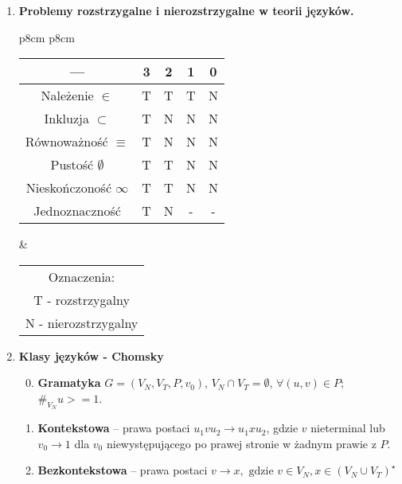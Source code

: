 \documentclass[12pt]{article}
\begin{document}
\begin{enumerate}
        \item \textbf{Problemy rozstrzygalne i nierozstrzygalne w teorii języków.}
        \begin{center}
            \begin{tabular}{p{8cm} p{8cm}}
                \begin{tabular}{c | c c c c}
                    ---                     & 3 & 2 & 1 & 0 \\ [0.5ex]
                    \hline
                    Należenie $\in$         & T & T & T & N \\
                    \hline
                    Inkluzja $\subset$      & T & N & N & N \\
                    \hline
                    Równoważność $\equiv$   & T & N & N & N \\
                    \hline
                    Pustość $\emptyset$     & T & T & N & N \\
                    \hline
                    Nieskończoność $\infty$ & T & T & N & N \\
                    \hline
                    Jednoznaczność          & T & N & - & - \\ [1ex]
                \end{tabular}
                &
                \begin{tabular}{c}
                    Oznaczenia:       \\
                    T - rozstrzygalny \\
                    N - nierozstrzygalny
                \end{tabular}
            \end{tabular}
        \end{center}

        \item \textbf{Klasy języków - Chomsky}
        \begin{enumerate}[noitemsep, label=\arabic*]
            \setcounter{enumii}{-1}
            \item \textbf{Gramatyka} $G=(V_N,V_T,P,v_0)$, $V_N \cap V_T = \emptyset$, $\forall (u,v)\in P$; $\#_{V_N} u >= 1$.

            \item \textbf{Kontekstowa} -- prawa postaci $u_1 v u_2 \rightarrow u_1 x u_2$, gdzie
            $v$ nieterminal lub $v_0 \rightarrow 1$ dla $v_0$ niewystępującego po prawej stronie w żadnym prawie z $P$.

            \item \textbf{Bezkontekstowa} -- prawa postaci
            $v \rightarrow x, \text{ gdzie } v \in V_N, x \in (V_N \cup V_T)^\star$


\end{enumerate}
\end{enumerate}
\end{document}
